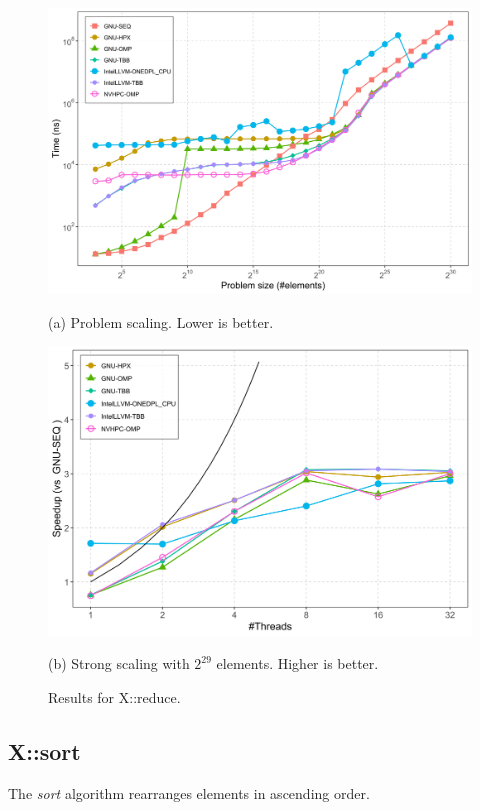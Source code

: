 \documentclass[sigconf]{acmart}
\begin{document}
\begin{figure}[H]
      \centering
      \begin{minipage}[t]{0.48\linewidth}
            \centering
            \includegraphics[width=\linewidth]{figures/problemSize_time-reduce.png}
            \caption*{(a) Problem scaling. Lower is better.}
      \end{minipage}
      \hfill
      \begin{minipage}[t]{0.48\linewidth}
            \centering
            \includegraphics[width=\linewidth]{figures/speedup_threads-reduce.png}
            \caption*{(b) Strong scaling with $2^{29}$ elements. Higher is better.}
      \end{minipage}
      \caption{Results for X::reduce.}\label{fig:x::reduce}
\end{figure}

\subsection{X::sort}
The \textit{sort} algorithm rearranges elements in ascending order.
\end{document}
